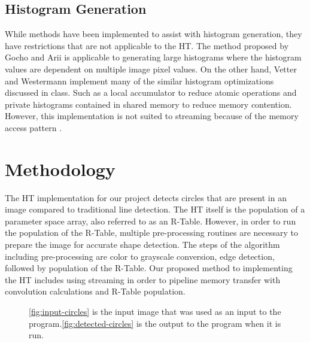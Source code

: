 \documentclass[conference]{IEEEtran}
\begin{document}
\subsection{Histogram Generation}
While methods have been implemented to assist with histogram generation, they have restrictions that are not applicable to the HT. 
The method proposed by Gocho and Arii\cite{9324376} is applicable to generating large histograms where the histogram values are dependent on multiple image pixel values.
On the other hand, Vetter and Westermann implement many of the similar histogram optimizations discussed in class.
Such as a local accumulator to reduce atomic operations and private histograms contained in shared memory to reduce memory contention. 
However, this implementation is not suited to streaming because of the memory access pattern \cite{5872623}. 


\section{Methodology}
The HT implementation for our project detects circles that are present in an image compared to traditional line detection.
The HT itself is the population of a parameter space array, also referred to as an R-Table.
However, in order to run the population of the R-Table, multiple pre-processing routines are necessary to prepare the image for accurate shape detection.
The steps of the algorithm including pre-processing are color to grayscale conversion, edge detection, followed by population of the R-Table.
Our proposed method to implementing the HT includes using streaming in order to pipeline memory transfer with convolution calculations and R-Table population.

\begin{figure*}%
  \centering
  \hfil
  \caption{\autoref{fig:input-circles} is the input image that was used as an input to the program.\autoref{fig:detected-circles} is the output to the program when it is run.}
\end{figure*}
\end{document}
